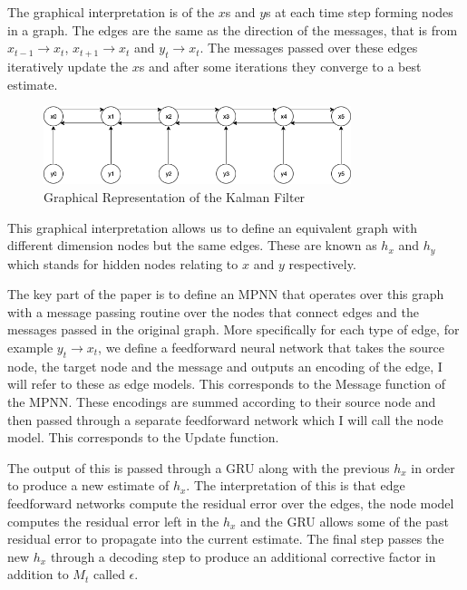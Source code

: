 \documentclass[]{../resources/final_report}
\begin{document}
The graphical interpretation is of the $x$s and $y$s at each time step forming nodes in a graph. The edges are the same as the direction of the messages, that is from $x_{t-1} \rightarrow x_t$, $x_{t+1} \rightarrow x_t$ and $y_t \rightarrow x_t$. The messages passed over these edges iteratively update the $x$s and after some iterations they converge to a best estimate.


\begin{figure}[h]
  \centering
  \includegraphics[width=0.8\textwidth]{GraphicalKalmanModel.png}  
  \caption{Graphical Representation of the Kalman Filter}
  \label{}
\end{figure}

This graphical interpretation allows us to define an equivalent graph with different dimension nodes but the same edges. These are known as $h_x$ and $h_y$ which stands for hidden nodes relating to $x$ and $y$ respectively. 


The key part of the paper is to define an MPNN that operates over this graph with a message passing routine over the nodes that connect edges and the messages passed in the original graph. More specifically for each type of edge, for example $y_t \rightarrow x_t$, we define a feedforward neural network that takes the source node, the target node and the message and outputs an encoding of the edge, I will refer to these as edge models. This corresponds to the Message function of the MPNN. These encodings are summed according to their source node and then passed through a separate feedforward network which I will call the node model. This corresponds to the Update function.

The output of this is passed through a GRU along with the previous $h_x$ in order to produce a new estimate of $h_x$. The interpretation of this is that edge feedforward networks compute the residual error over the edges, the node model computes the residual error left in the $h_x$ and the GRU allows some of the past residual error to propagate into the current estimate. The final step passes the new $h_x$ through a decoding step to produce an additional corrective factor in addition to $M_t$ called $\epsilon$.
\end{document}
